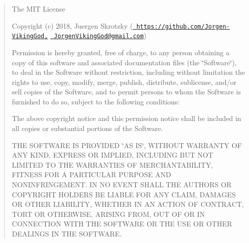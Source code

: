 \begin{quote}
The M\+IT License

Copyright (c) 2018, Juergen Skrotzky (\href{https://github.com/Jorgen-VikingGod,}{\texttt{ https\+://github.\+com/\+Jorgen-\/\+Viking\+God,}} \href{mailto:JorgenVikingGod@gmail.com}{\texttt{ Jorgen\+Viking\+God@gmail.\+com}})

Permission is hereby granted, free of charge, to any person obtaining a copy of this software and associated documentation files (the \char`\"{}\+Software\char`\"{}), to deal in the Software without restriction, including without limitation the rights to use, copy, modify, merge, publish, distribute, sublicense, and/or sell copies of the Software, and to permit persons to whom the Software is furnished to do so, subject to the following conditions\+:

The above copyright notice and this permission notice shall be included in all copies or substantial portions of the Software.

T\+HE S\+O\+F\+T\+W\+A\+RE IS P\+R\+O\+V\+I\+D\+ED \char`\"{}\+A\+S I\+S\char`\"{}, W\+I\+T\+H\+O\+UT W\+A\+R\+R\+A\+N\+TY OF A\+NY K\+I\+ND, E\+X\+P\+R\+E\+SS OR I\+M\+P\+L\+I\+ED, I\+N\+C\+L\+U\+D\+I\+NG B\+UT N\+OT L\+I\+M\+I\+T\+ED TO T\+HE W\+A\+R\+R\+A\+N\+T\+I\+ES OF M\+E\+R\+C\+H\+A\+N\+T\+A\+B\+I\+L\+I\+TY, F\+I\+T\+N\+E\+SS F\+OR A P\+A\+R\+T\+I\+C\+U\+L\+AR P\+U\+R\+P\+O\+SE A\+ND N\+O\+N\+I\+N\+F\+R\+I\+N\+G\+E\+M\+E\+NT. IN NO E\+V\+E\+NT S\+H\+A\+LL T\+HE A\+U\+T\+H\+O\+RS OR C\+O\+P\+Y\+R\+I\+G\+HT H\+O\+L\+D\+E\+RS BE L\+I\+A\+B\+LE F\+OR A\+NY C\+L\+A\+IM, D\+A\+M\+A\+G\+ES OR O\+T\+H\+ER L\+I\+A\+B\+I\+L\+I\+TY, W\+H\+E\+T\+H\+ER IN AN A\+C\+T\+I\+ON OF C\+O\+N\+T\+R\+A\+CT, T\+O\+RT OR O\+T\+H\+E\+R\+W\+I\+SE, A\+R\+I\+S\+I\+NG F\+R\+OM, O\+UT OF OR IN C\+O\+N\+N\+E\+C\+T\+I\+ON W\+I\+TH T\+HE S\+O\+F\+T\+W\+A\+RE OR T\+HE U\+SE OR O\+T\+H\+ER D\+E\+A\+L\+I\+N\+GS IN T\+HE S\+O\+F\+T\+W\+A\+RE. \end{quote}
